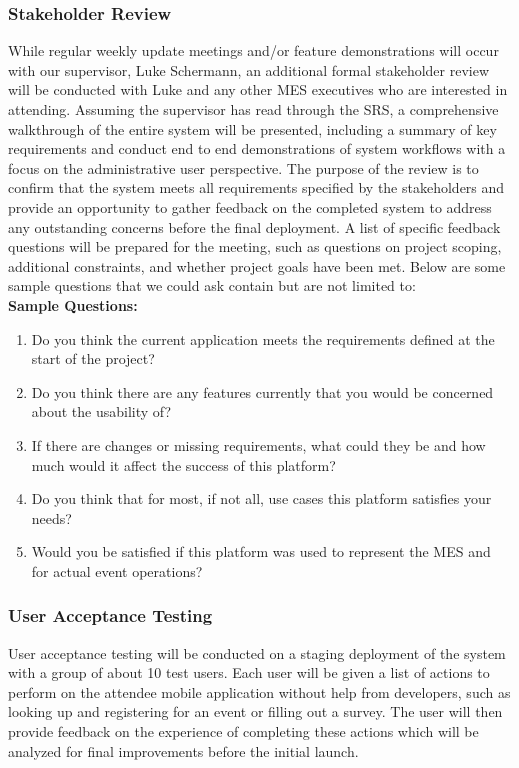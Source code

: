 \documentclass[12pt, titlepage]{article}
\begin{document}
\subsubsection{Stakeholder Review}
  While regular weekly update meetings and/or feature demonstrations will occur with our supervisor, Luke Schermann, an additional formal stakeholder review will be conducted with Luke and any other MES executives who are interested in attending. Assuming the supervisor has read through the SRS, a comprehensive walkthrough of the entire system will be presented, including a summary of key requirements and conduct end to end demonstrations of system workflows with a focus on the administrative user perspective. The purpose of the review is to confirm that the system meets all requirements specified by the stakeholders and provide an opportunity to gather feedback on the completed system to address any outstanding concerns before the final deployment. A list of specific feedback questions will be prepared for the meeting, such as questions on project scoping, additional constraints, and whether project goals have been met. Below are some sample questions that we could ask contain but are not limited to:\\
  \textbf{Sample Questions:}
  \begin{enumerate}
    \item Do you think the current application meets the requirements defined at the start of the project?
    \item Do you think there are any features currently that you would be concerned about the usability of?
    \item If there are changes or missing requirements, what could they be and how much would it affect the success of this platform?
    \item Do you think that for most, if not all, use cases this platform satisfies your needs?
    \item Would you be satisfied if this platform was used to represent the MES and for actual event operations?
  \end{enumerate}


  \subsubsection{User Acceptance Testing}
  User acceptance testing will be conducted on a staging deployment of the system with a group of about 10 test users. Each user will be given a list of actions to perform on the attendee mobile application without help from developers, such as looking up and registering for an event or filling out a survey. The user will then provide feedback on the experience of completing these actions which will be analyzed for final improvements before the initial launch.
\end{document}
